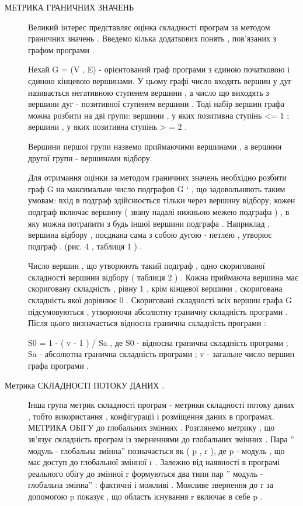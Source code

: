 \documentclass[oneside,final,14pt]{extreport}
\begin{document}
\begin{description}
\item[{МЕТРИКА ГРАНИЧНИХ ЗНАЧЕНЬ}] \leavevmode
Великий інтерес представляє оцінка складності програм за методом граничних значень .
Введемо кілька додаткових понять , пов'язаних з графом програми .

Нехай G = (V , E) - орієнтований граф програми з єдиною початковою і єдиною кінцевою вершинами. У цьому графі число входять вершин у дуг називається негативною ступенем вершини , а число що виходять з вершини дуг - позитивної ступенем вершини . Тоді набір вершин графа можна розбити на дві групи: вершини , у яких позитивна ступінь \textless{}= 1 ; вершини , у яких позитивна ступінь \textgreater{} = 2 .

Вершини першої групи назвемо приймаючими вершинами , а вершини другої групи - вершинами відбору.

Для отримання оцінки за методом граничних значень необхідно розбити граф G на максимальне число подграфов G ` , що задовольняють таким умовам: вхід в подграф здійснюється тільки через вершину відбору; кожен подграф включає вершину ( звану надалі нижньою межею подграфа ) , в яку можна потрапити з будь іншої вершини подграфа . Наприклад , вершина відбору , поєднана сама з собою дугою - петлею , утворює подграф . (рис. 4 , таблиця 1 ) .

Число вершин , що утворюють такий подграф , одно скоригованої складності вершини відбору ( таблиця 2 ) . Кожна приймаюча вершина має скориговану складність , рівну 1 , крім кінцевої вершини , скоригована складність якої дорівнює 0 . Скориговані складності всіх вершин графа G підсумовуються , утворюючи абсолютну граничну складність програми . Після цього визначається відносна гранична складність програми :

S0 = 1 - ( v - 1 ) / Sa ,
де S0 - відносна гранична складність програми ; Sa - абсолютна гранична складність програми ; v - загальне число вершин графа програми .

\item[{Метрика СКЛАДНОСТІ ПОТОКУ ДАНИХ .}] \leavevmode
Інша група метрик складності програм - метрики складності потоку даних , тобто використання , конфігурації і розміщення даних в програмах.
МЕТРИКА ОБІГУ до глобальних змінних .
Розглянемо метрику , що зв'язує складність програм із зверненнями до глобальних змінних .
Пара '' модуль - глобальна змінна'' позначається як ( p , r ), де p - модуль , що має доступ до глобальної змінної r . Залежно від наявності в програмі реального обігу до змінної r формуються два типи пар '' модуль - глобальна змінна'' : фактичні і можливі . Можливе звернення до r за допомогою p показує , що область існування r включає в себе p .


\end{description}
\end{document}
